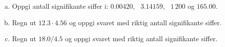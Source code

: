 %
\begin{enumerate}[a)]
    \item Oppgi antall signifikante siffer i: $0.00420$, \ $3.14159$, \ $1\,200$ og $165.00$.
    \item Regn ut $12.3 \cdot 4.56$ og oppgi svaret med riktig antall signifikante siffer.
    \item Regn ut $18.0 / 4.5$ og oppgi svaret med riktig antall signifikante siffer.
\end{enumerate}

